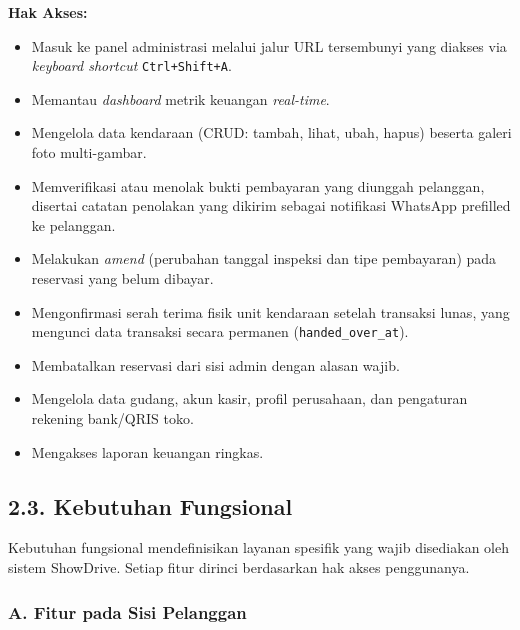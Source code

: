 \documentclass[11pt, a5paper]{article}
\begin{document}
\textbf{Hak Akses:}
\begin{itemize}
  \item Masuk ke panel administrasi melalui jalur URL tersembunyi yang diakses
        via \textit{keyboard shortcut} \texttt{Ctrl+Shift+A}.
  \item Memantau \textit{dashboard} metrik keuangan \textit{real-time}.
  \item Mengelola data kendaraan (CRUD: tambah, lihat, ubah, hapus) beserta
        galeri foto multi-gambar.
  \item Memverifikasi atau menolak bukti pembayaran yang diunggah pelanggan,
        disertai catatan penolakan yang dikirim sebagai notifikasi WhatsApp
        prefilled ke pelanggan.
  \item Melakukan \textit{amend} (perubahan tanggal inspeksi dan tipe pembayaran)
        pada reservasi yang belum dibayar.
  \item Mengonfirmasi serah terima fisik unit kendaraan setelah transaksi lunas,
        yang mengunci data transaksi secara permanen (\texttt{handed\_over\_at}).
  \item Membatalkan reservasi dari sisi admin dengan alasan wajib.
  \item Mengelola data gudang, akun kasir, profil perusahaan, dan pengaturan
        rekening bank/QRIS toko.
  \item Mengakses laporan keuangan ringkas.
\end{itemize}

\subsection*{2.3. Kebutuhan Fungsional}

Kebutuhan fungsional mendefinisikan layanan spesifik yang wajib disediakan oleh
sistem ShowDrive. Setiap fitur dirinci berdasarkan hak akses penggunanya.

\subsubsection*{A. Fitur pada Sisi Pelanggan}
\end{document}
